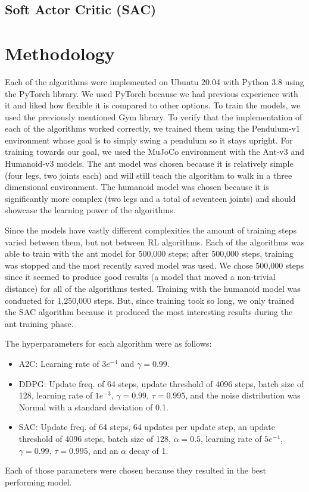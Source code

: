 \documentclass[conference]{IEEEtran}
\begin{document}
\subsection{Soft Actor Critic (SAC)}

\blindtext

\section{Methodology}

Each of the algorithms were implemented on Ubuntu 20.04 with Python 3.8 using the PyTorch library. We used PyTorch
because we had previous experience with it and liked how flexible it is compared to other options. To train the models,
we used the previously mentioned Gym library. To verify that the implementation of each of the algorithms worked
correctly, we trained them using the Pendulum-v1 environment whose goal is to simply swing a pendulum so it stays
upright. For training towards our goal, we used the MuJoCo environment with the Ant-v3 and Humanoid-v3 models. The ant
model was chosen because it is relatively simple (four legs, two joints each) and will still teach the algorithm to walk
in a three dimensional environment. The humanoid model was chosen because it is significantly more complex (two legs and
a total of seventeen joints) and should showcase the learning power of the algorithms.

Since the models have vastly different complexities the amount of training steps varied between them, but not between RL
algorithms. Each of the algorithms was able to train with the ant model for 500,000 steps; after 500,000 steps, training
was stopped and the most recently saved model was used. We chose 500,000 steps since it seemed to produce good results
(a model that moved a non-trivial distance) for all of the algorithms tested. Training with the humanoid model was
conducted for 1,250,000 steps. But, since training took so long, we only trained the SAC algorithm because it produced
the most interesting results during the ant training phase.

The hyperparameters for each algorithm were as follows:
\begin{itemize}
    \item A2C: Learning rate of $3e^{-4}$ and $\gamma = 0.99$.
    \item DDPG: Update freq. of 64 steps, update threshold of 4096 steps, batch size of 128, learning rate of $1e^{-3}$,
          $\gamma = 0.99$, $\tau = 0.995$, and the noise distribution was Normal with a standard deviation of 0.1.
    \item SAC: Update freq. of 64 steps, 64 updates per update step, an update threshold of 4096 steps, batch size of
          128, $\alpha = 0.5$, learning rate of $5e^{-4}$, $\gamma = 0.99$, $\tau = 0.995$, and an $\alpha$ decay of 1.
\end{itemize}
Each of those parameters were chosen because they resulted in the best performing model.
\end{document}
